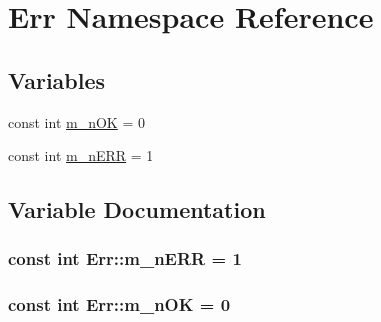 \hypertarget{namespace_err}{
\section{Err Namespace Reference}
\label{namespace_err}
}
\subsection*{Variables}
\begin{DoxyCompactItemize}
\item 
const int \hyperlink{namespace_err_a19e5fc005060ccd444b11dc94efd1470}{m\_\-nOK} = 0
\item 
const int \hyperlink{namespace_err_a52c79905a21af22a158f45325c6275cb}{m\_\-nERR} = 1
\end{DoxyCompactItemize}


\subsection{Variable Documentation}
\hypertarget{namespace_err_a52c79905a21af22a158f45325c6275cb}{
\subsubsection[{m\_\-nERR}]{\setlength{\rightskip}{0pt plus 5cm}const int {\bf Err::m\_\-nERR} = 1}}
\label{namespace_err_a52c79905a21af22a158f45325c6275cb}
\hypertarget{namespace_err_a19e5fc005060ccd444b11dc94efd1470}{
\subsubsection[{m\_\-nOK}]{\setlength{\rightskip}{0pt plus 5cm}const int {\bf Err::m\_\-nOK} = 0}}
\label{namespace_err_a19e5fc005060ccd444b11dc94efd1470}
